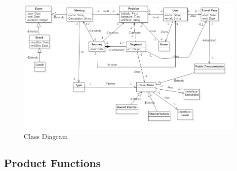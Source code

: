 \begin{figure}
    \centering
	\includegraphics[scale=0.6]{images/classdiagram}
	\caption{Class Diagram}
	\label{fig:classdiagramrotate}
\end{figure}

\clearpage

\subsection{Product Functions}

